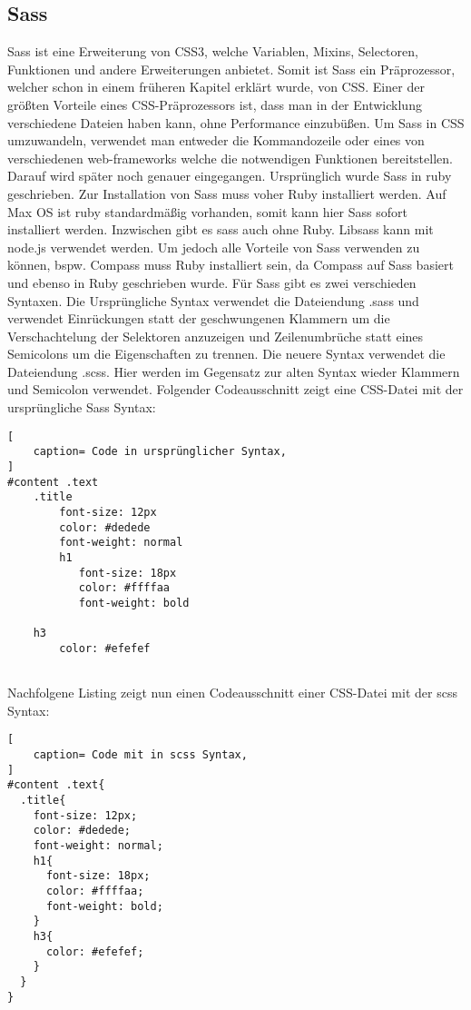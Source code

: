\subsection{Sass}
Sass ist eine Erweiterung von CSS3, welche Variablen, Mixins, Selectoren, Funktionen und andere Erweiterungen anbietet. Somit ist Sass ein Präprozessor, welcher schon in einem früheren Kapitel erklärt wurde, von CSS.\newline
Einer der größten Vorteile eines CSS-Präprozessors ist, dass man in der Entwicklung verschiedene Dateien haben kann, ohne Performance einzubüßen.\newline
Um Sass in CSS umzuwandeln, verwendet man entweder die Kommandozeile oder eines von verschiedenen web-frameworks welche die notwendigen Funktionen bereitstellen. Darauf wird später noch genauer eingegangen.\newline
Ursprünglich wurde Sass in ruby geschrieben. Zur Installation von Sass muss voher Ruby installiert werden. Auf Max OS ist ruby standardmäßig vorhanden, somit kann hier Sass sofort installiert werden. Inzwischen gibt es sass auch ohne Ruby. Libsass kann mit node.js verwendet werden. \newline
Um jedoch alle Vorteile von Sass verwenden zu können, bspw. Compass muss Ruby installiert sein, da Compass auf Sass basiert und ebenso in Ruby geschrieben wurde.\newline
Für Sass gibt es zwei verschieden Syntaxen. Die Ursprüngliche Syntax verwendet die Dateiendung .sass und verwendet Einrückungen statt der geschwungenen Klammern um die Verschachtelung der Selektoren anzuzeigen und Zeilenumbrüche statt eines Semicolons um die Eigenschaften zu trennen.\newline
Die neuere Syntax verwendet die Dateiendung .scss. Hier werden im Gegensatz zur alten Syntax wieder Klammern und Semicolon verwendet.  \autocite[]{Yard.2014}\newline
Folgender Codeausschnitt zeigt eine CSS-Datei mit der ursprüngliche Sass Syntax:
\begin{lstlisting}[
	caption= Code in ursprünglicher Syntax,
]
#content .text
    .title
        font-size: 12px
        color: #dedede
        font-weight: normal
        h1
           font-size: 18px
           color: #ffffaa
           font-weight: bold
    
    h3
        color: #efefef
    
\end{lstlisting}

Nachfolgene Listing zeigt nun einen Codeausschnitt einer CSS-Datei mit der scss Syntax:
\begin{lstlisting}[
	caption= Code mit in scss Syntax,
]
#content .text{
  .title{
    font-size: 12px;
    color: #dedede;
    font-weight: normal;
    h1{
      font-size: 18px;
      color: #ffffaa;
      font-weight: bold;
    }
    h3{
      color: #efefef;
    }
  }
}
\end{lstlisting}

